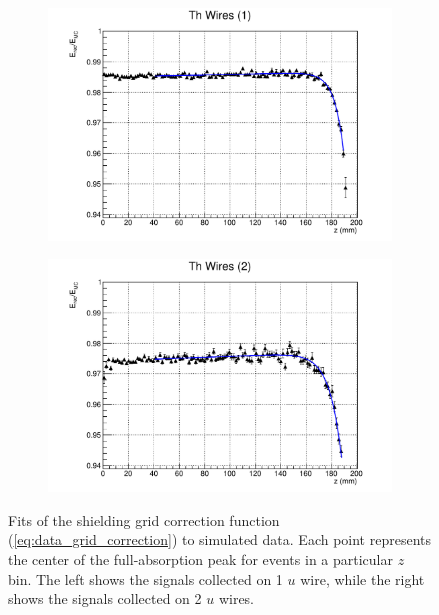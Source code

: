 \documentclass[herrin-thesis.tex]{subfiles}
\begin{document}
\begin{figure}[htp]
\centering
	\begin{subfigure}[t]{0.48\textwidth}
		\centering
		\includegraphics[width=\textwidth]{./plots/data_grid_correction_Th1wire.pdf}
	\end{subfigure}\hfill%
	\begin{subfigure}[t]{0.48\textwidth}
		\centering
		\includegraphics[width=\textwidth]{./plots/data_grid_correction_Th2wire.pdf}
	\end{subfigure}
	\caption[Fits to determine the shieldin grid correction parameters]{Fits of the shielding grid correction function (\cref{eq:data_grid_correction}) to simulated  data. Each point represents the center of the full-absorption peak for events in a particular \(z\) bin. The left shows the signals collected on 1 \(u\) wire, while the right shows the signals collected on 2 \(u\) wires.}
	\label{fig:data_grid_correction_fits}
\end{figure}
\end{document}
